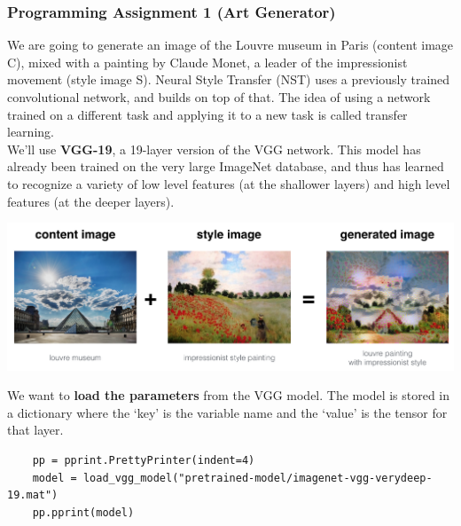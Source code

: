 \documentclass[11pt, a4paper]{article}
\begin{document}
\begin{spacing}{1.1}
	\subsubsection{Programming Assignment 1 (Art Generator)}
	We are going to generate an image of the Louvre museum in Paris (content image C), mixed with a painting by Claude Monet, a leader of the impressionist movement (style image S). Neural Style Transfer (NST) uses a previously trained convolutional network, and builds on top of that. The idea of using a network trained on a different task and applying it to a new task is called transfer learning. \vspace*{1mm} \\ 
	We'll use \textbf{VGG-19}, a 19-layer version of the VGG network. This model has already been trained on the very large ImageNet database, and thus has learned to recognize a variety of low level features (at the shallower layers) and high level features (at the deeper layers).
	\begin{center} \includegraphics[scale=0.6]{nst} \end{center}
	We want to \textbf{load the parameters} from the VGG model. The model is stored in a dictionary where the `key' is the variable name and the `value' is the tensor for that layer.
	\begin{lstlisting}
	pp = pprint.PrettyPrinter(indent=4)
	model = load_vgg_model("pretrained-model/imagenet-vgg-verydeep-19.mat")
	pp.pprint(model) \end{lstlisting} \newpage


\end{spacing}
\end{document}
